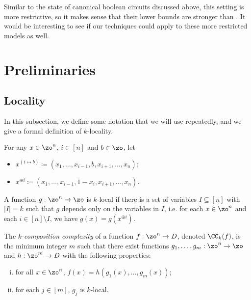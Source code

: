 Similar to the state of canonical boolean circuits discussed above, this setting is more restrictive, so it makes sense that their lower bounds are stronger than . 
It would be interesting to see if our techniques could apply to these more restricted models as well.














\section{Preliminaries}

\subsection{Locality}
In this subsection, we define some notation that we will use repeatedly, and we give a formal definition of $k$-locality.

\begin{definition}
For any $x \in \zo^n$, $i \in [n]$ and $b \in \zo$, let
\begin{itemize}
    \item $x^{(i \mapsto b)} \coloneqq (x_1, \ldots, x_{i-1}, b, x_{i+1}, \ldots, x_n)$;
    \item $x^{\oplus i} \coloneqq (x_1, \ldots, x_{i-1}, 1-x_i, x_{i+1}, \ldots, x_n)$.
\end{itemize}
\end{definition}

\begin{definition}[$k$-local]
A function $g: \zo^n \to \zo$ is $k$-local if there is a set of variables $I \subseteq [n]$ with $|I|=k$ such that $g$ depends only on the variables in $I$, i.e. for each $x\in \zo^n$ and each $i \in [n] \setminus I$, we have $g(x) = g(x^{\oplus i})$.
\end{definition}

\begin{definition}
The \emph{$k$-composition complexity} of a function $f: \zo^n \to D$, denoted $\CC_k(f)$, is the minimum integer $m$ such that there exist functions $g_1, \ldots, g_m : \zo^n \to \zo$ and $h:\zo^m \to D$
with the following properties:
\begin{enumerate}[(i)]
    \item for all $x \in \zo^n$, $f(x) = h(g_1(x), \ldots, g_m(x))$;
    \item for each $j \in [m]$, $g_j$ is $k$-local.
\end{enumerate}
\end{definition}

